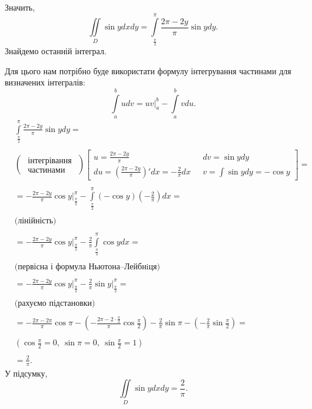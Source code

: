 \begin{example}
Значить,
\[
\iint\limits_D \sin y d x d y = \int\limits_{\frac{\pi}{2}}^{\pi}\frac{2\pi - 2 y}{\pi}\sin y dy.
\]
Знайдемо останній інтеграл.

Для цього нам потрібно буде використати формулу інтегрування частинами для визначених інтегралів:
\[
\int\limits_a^b u dv = u v \biggr|_a^b - \int\limits_a^b v du.
\]
\begin{align*}
&\int\limits_{\frac{\pi}{2}}^{\pi}\frac{2\pi - 2 y}{\pi}\sin y dy = &\\\\
&\left(\begin{array}{c}\mbox{ інтегрівання }\\ \mbox{ частинами }\end{array}\right)\left[\begin{array}{ll}u = \frac{2\pi - 2 y}{\pi} & \ \ \ dv = \sin y dy\\ du = \left(\frac{2\pi - 2 y}{\pi}\right)'dx = -\frac{2}{\pi}dx & \ \ \ v = \int \sin y dy = -\cos y\end{array}\right] = &\\\\
&= - \frac{2\pi - 2 y}{\pi} \cos y \biggr|_{\frac{\pi}{2}}^{\pi} - \int\limits_{\frac{\pi}{2}}^{\pi}\left(-\cos y\right)\left(-\frac{2}{\pi}\right)dx = & \\\\
&\mbox{(лінійність)} &\\\\
&= - \frac{2\pi - 2 y}{\pi} \cos y \biggr|_{\frac{\pi}{2}}^{\pi} - \frac{2}{\pi}\int\limits_{\frac{\pi}{2}}^{\pi}\cos ydx = &\\\\
&\mbox{(первісна і формула Ньютона--Лейбнiця)}&\\\\
&= - \frac{2\pi - 2 y}{\pi} \cos y \biggr|_{\frac{\pi}{2}}^{\pi} - \frac{2}{\pi}\sin y\biggr|_{\frac{\pi}{2}}^{\pi} = &\\\\
&\mbox{(рахуємо підстановки)}&\\\\
&= - \frac{2\pi - 2 \pi}{\pi} \cos \pi - \left(- \frac{2\pi - 2\cdot \frac{\pi}{2}}{\pi} \cos \frac{\pi}{2}\right) - \frac{2}{\pi}\sin \pi - \left(- \frac{2}{\pi}\sin\frac{\pi}{2}\right)=&\\\\
&\left(\cos\frac{\pi}{2}=0,\ \sin\pi = 0,\ \sin\frac{\pi}{2}=1\right)&\\\\
&=\frac{2}{\pi}.&
\end{align*}
У підсумку,
\[
\iint\limits_D \sin y d x d y = \frac{2}{\pi}.
\]
\end{example}















